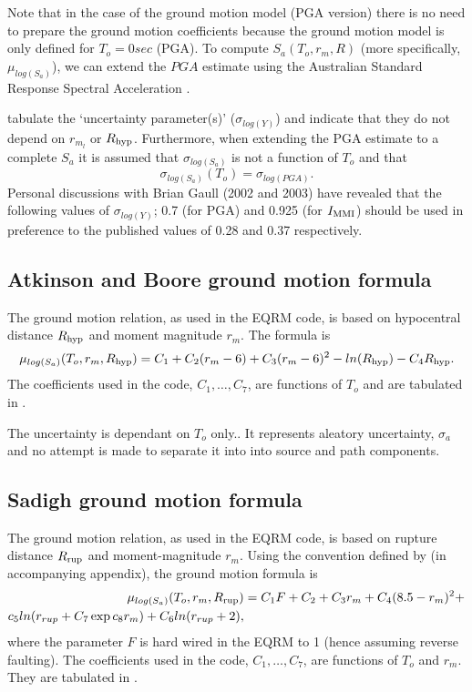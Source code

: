Note that in the case of the \citet{dr_Gaull90a} ground motion model
(PGA version) there is no need to prepare the ground motion
coefficients because the ground motion model is only defined for
$T_o=0 sec$ (PGA). To compute $S_a(T_o,r_m,R)$ (more specifically,
$\mu_{log(S_a)}$), we can extend the $PGA$ estimate using the
Australian Standard Response Spectral Acceleration
\citep{dr_Standards93a}. 

\citet[Table 4]{dr_Gaull90a} tabulate the `uncertainty
parameter(s)' ($\sigma_{log(Y)}$) and indicate that they do not
depend on $r_{m_l}$ or $\Rhyp$. Furthermore, when extending the
PGA estimate to a complete $S_a$ it is assumed that
$\sigma_{log(S_a)}$ is not a function of $T_o$ and that
\begin{equation}
\sigma_{log(S_a)}(T_o) = \sigma_{log(PGA)}.
\end{equation}
Personal discussions with Brian Gaull (2002 and 2003) have
revealed that the following values of $\sigma_{log(Y)}$; 0.7 (for
PGA) and 0.925 (for $\Imm$) should be used in preference to the
published values of 0.28 and 0.37 respectively.


\subsection{Atkinson and Boore ground motion formula}

The \cite{dr_Atkinson97a} ground motion relation, as used in the
EQRM code, is based on hypocentral distance $\Rhyp$ and moment
magnitude $r_m$. The formula is
\begin{equation}
\mu_{log(S_a)}(T_o,r_m,\Rhyp) = C_1 + C_2(r_m-6) + C_3(r_m-6)^2
-ln(\Rhyp)-C_4\Rhyp.
\end{equation}
The coefficients used in the code, $C_1,\ldots,C_7$, are functions
of $T_o$ and are tabulated in \citet[Table 1]{dr_Atkinson97a}.

The uncertainty is dependant on $T_o$ only.. It represents aleatory uncertainty,
$\sigma_a$ and no attempt is made to separate it into into source
and path components.


\subsection{Sadigh ground motion formula}

The \cite{dr_Sadigh97a} ground motion relation, as used in the EQRM
code, is based on rupture distance $\Rrup$ and moment-magnitude
$r_m$. Using the convention defined by \citet{dr_Campbell03a} (in
accompanying appendix), the ground motion formula is
\begin{equation}
\begin{split}
\mu_{log(S_a)}(T_o,r_m,\Rrup) & = C_1F +C_2 + C_3r_m
+C_4(8.5-r_m)^2 + \\ c_5ln(r_{rup}+C_7\exp{c_8r_m}) +
C_6ln(r_{rup}+2),
\end{split}
\end{equation}
where the parameter $F$ is hard wired in the EQRM to 1 (hence
assuming reverse faulting). The coefficients used in the code,
$C_1,\ldots,C_7$, are functions of $T_o$ and $ r_m$. They are
tabulated in \citet[Table 2]{dr_Sadigh97a}.

